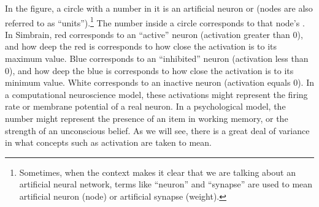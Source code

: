 In the figure, a circle with a number in it is an artificial neuron or  (nodes are also referred to as ``units'').\footnote{Sometimes, when the context makes it clear that we are talking about an artificial neural network, terms like ``neuron'' and ``synapse'' are used to mean artificial neuron (node) or artificial synapse (weight).}  The number inside a circle corresponds to that node's . In Simbrain, red corresponds to an ``active'' neuron (activation greater than 0), and how deep the red is corresponds to how close the activation is to its maximum value. Blue corresponds to an ``inhibited'' neuron (activation less than 0), and how deep the blue is corresponds to how close the activation is to its minimum value. White corresponds to an inactive neuron (activation equals 0). In a computational neuroscience model, these activations might represent the firing rate or membrane potential of a real neuron. In a psychological model, the number might represent the presence of an item in working memory, or the strength of an unconscious belief. As we will see, there is a great deal of variance in what concepts such as activation are taken to mean.

